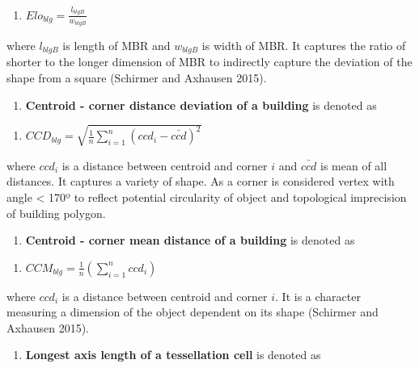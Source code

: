 \documentclass[
  letterpaper,
  DIV=11,
  numbers=noendperiod]{scrartcl}
\providecommand{\tightlist}{%
  \setlength{\itemsep}{0pt}\setlength{\parskip}{0pt}}\usepackage{longtable,booktabs,array}
\begin{document}
\begin{enumerate}
\def\labelenumi{(\arabic{enumi})}
\setcounter{enumi}{7}
\tightlist
\item
  \(Elo_{blg} =  \frac{l_{blgB}}{w_{blgB}}\)
\end{enumerate}

where \(l_{blgB}\) is length of MBR and \(w_{blgB}\) is width of MBR. It
captures the ratio of shorter to the longer dimension of MBR to
indirectly capture the deviation of the shape from a square (Schirmer
and Axhausen 2015).

\begin{enumerate}
\def\labelenumi{\arabic{enumi}.}
\setcounter{enumi}{8}
\tightlist
\item
  \textbf{Centroid - corner distance deviation of a building} is denoted
  as
\end{enumerate}

\begin{enumerate}
\def\labelenumi{(\arabic{enumi})}
\setcounter{enumi}{8}
\tightlist
\item
  \(CCD_{blg} =  \sqrt{\frac{1}{n} \sum_{i=1}^{n}\left(ccd_{i}-\bar{ccd}\right)^{2}}\)
\end{enumerate}

where \(ccd_i\) is a distance between centroid and corner \(i\) and
\(\bar{ccd}\) is mean of all distances. It captures a variety of shape.
As a corner is considered vertex with angle \textless{} 170º to reflect
potential circularity of object and topological imprecision of building
polygon.

\begin{enumerate}
\def\labelenumi{\arabic{enumi}.}
\setcounter{enumi}{9}
\tightlist
\item
  \textbf{Centroid - corner mean distance of a building} is denoted as
\end{enumerate}

\begin{enumerate}
\def\labelenumi{(\arabic{enumi})}
\setcounter{enumi}{9}
\tightlist
\item
  \(CCM_{blg} =\frac{1}{n}\left(\sum_{i=1}^{n} ccd_{i}\right)\)
\end{enumerate}

where \(ccd_i\) is a distance between centroid and corner \(i\). It is a
character measuring a dimension of the object dependent on its shape
(Schirmer and Axhausen 2015).

\begin{enumerate}
\def\labelenumi{\arabic{enumi}.}
\setcounter{enumi}{10}
\tightlist
\item
  \textbf{Longest axis length of a tessellation cell} is denoted as
\end{enumerate}
\end{document}
